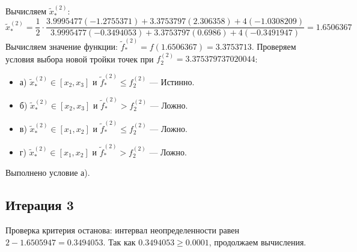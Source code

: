 \documentclass[12pt]{article}
\begin{document}
Вычисляем \( \tilde{x}_{*}^{(2)} \):
$$ \tilde{x}_{*}^{(2)} = \frac{1}{2}\cdot\frac{3.9995477(-1.2755371) + 3.3753797(2.306358) + 4(-1.0308209)}{3.9995477(-0.3494053) + 3.3753797(0.6986) + 4(-0.3491947)} = 1.6506367 $$
Вычисляем значение функции: \( \tilde{f}_{*}^{(2)} = f(1.6506367) = 3.3753713\).
Проверяем условия выбора новой тройки точек при $f_2^{(2)} = 3.375379737020044$:
\begin{itemize}
  \item а) \( \tilde{x}_{*}^{(2)} \in [x_2, x_3] \) и \( \tilde{f}_{*}^{(2)} \le f_2^{(2)} \) --- Истинно.
  \item б) \( \tilde{x}_{*}^{(2)} \in [x_2, x_3] \) и \( \tilde{f}_{*}^{(2)} > f_2^{(2)} \) --- Ложно.
  \item в) \( \tilde{x}_{*}^{(2)} \in [x_1, x_2] \) и \( \tilde{f}_{*}^{(2)} \le f_2^{(2)} \) --- Ложно.
  \item г) \( \tilde{x}_{*}^{(2)} \in [x_1, x_2] \) и \( \tilde{f}_{*}^{(2)} > f_2^{(2)} \) --- Ложно.
\end{itemize}
Выполнено условие а).
\begin{center}
\end{center}
\subsection{Итерация 3}
Проверка критерия останова: интервал неопределенности равен \( 2 - 1.6505947 = 0.3494053 \).
Так как \( 0.3494053 \ge 0.0001 \), продолжаем вычисления.
\end{document}

